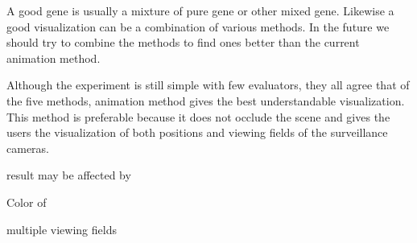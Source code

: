 A good gene is usually a mixture of pure gene or other mixed gene. Likewise a good visualization can be a combination of various methods. In the future we should try to combine the methods to find ones better than the current animation method.

Although the experiment is still simple with few evaluators, they all agree that of the five methods, animation method gives the best understandable visualization. This method is preferable because it does not occlude the scene and gives the users the visualization of both positions and viewing fields of the surveillance cameras.

result may be affected by

Color of

multiple viewing fields

